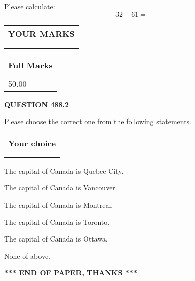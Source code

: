 \documentclass[12pt]{article}
\begin{document}
  
 
Please calculate:
\begin{equation}
32 +  %
61 = \nonumber
\end{equation}
 

 

 
  
\vspace{0.2in}
  
\noindent\begin{tabular}{|l|}
\hline
 YOUR MARKS  \\
\hline
 \\ 
 \\ 
\hline
\end{tabular}
\hspace{0.05in} \begin{tabular}{|l|}
\hline
 Full Marks  \\
\hline
 \\ 
50.00 \\
\hline
\end{tabular}
{\textbf{\Large{QUESTION
488.2 
}}}
  
  
Please choose the correct one from the following statements.
  
  
\noindent\hspace{3.0in} \begin{tabular}{|l|}
\hline
Your choice \\
\hline
 \\ 
 \\ 
\hline
\end{tabular}
  
  
 
 
The capital of Canada is Quebec City.
 
 
The capital of Canada is Vancouver.
 
 
The capital of Canada is Montreal.
 
 
The capital of Canada is Toronto.
 
 
The capital of Canada is Ottawa.
 
 
 None of above.
 
 
   
   
 \vspace{0.2in}
 
   
   
   
   
\vspace{1.0in} 
{\textbf{\large{ *** END OF PAPER, THANKS *** }}} 
   
\end{document}
